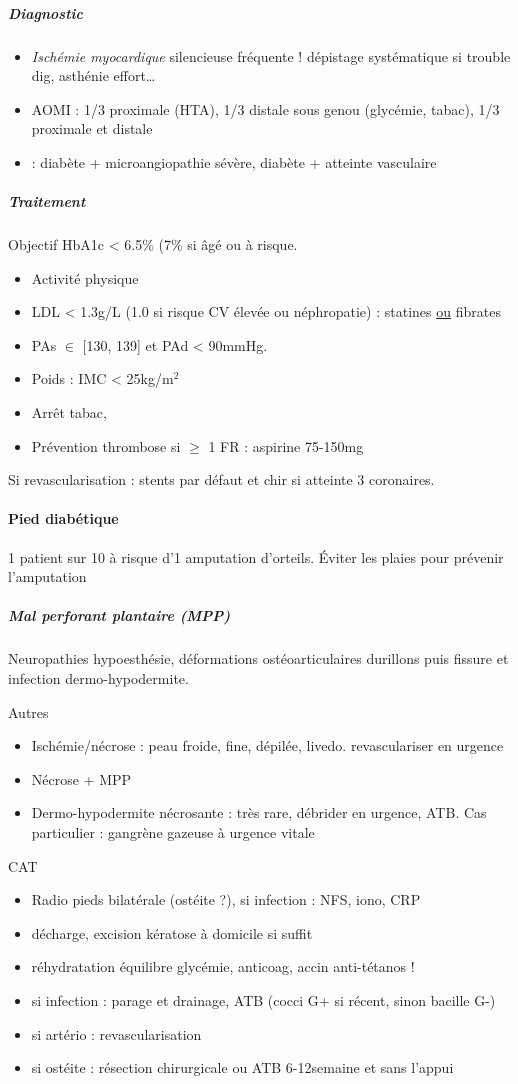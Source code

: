 \documentclass[11pt]{article}
\begin{document}
\subparagraph{Diagnostic}
\label{sec:orgec7b922}
\begin{itemize}
\item \emph{Ischémie myocardique} silencieuse fréquente ! \thus dépistage systématique si
trouble dig, asthénie effort\ldots{}
\item AOMI : 1/3 proximale (HTA), 1/3 distale sous genou (glycémie, tabac), 1/3 proximale et distale
\item \faBomb : diabète + microangiopathie sévère, diabète + atteinte vasculaire
\end{itemize}

\subparagraph{Traitement}
\label{sec:org06f1492}
Objectif HbA1c < 6.5\% (7\% si âgé ou à risque.
\begin{itemize}
\item Activité physique
\item LDL < 1.3g/L (1.0 si risque CV élevée ou néphropatie) : statines \uline{ou} fibrates
\item PAs \(\in\) [130, 139] et PAd < 90mmHg.
\item Poids : IMC < 25kg/m\(^{\text{2}}\)
\item Arrêt tabac,
\item Prévention thrombose si \(\ge\) 1 FR : aspirine 75-150mg
\end{itemize}
Si revascularisation : stents par défaut  et chir si atteinte 3 coronaires.

\paragraph{Pied diabétique}
\label{sec:orga4330d5}
1 patient sur 10 à risque d'1 amputation d'orteils. Éviter les plaies pour prévenir l'amputation
\faBomb
\subparagraph{Mal perforant plantaire (MPP)}
\label{sec:org623d7c5}
Neuropathies \thus hypoesthésie, déformations ostéoarticulaires \thus durillons
puis fissure et infection \thus dermo-hypodermite.

Autres
\begin{itemize}
\item Ischémie/nécrose : peau froide, fine, dépilée, livedo. \thus revasculariser en urgence \faBomb
\item Nécrose + MPP
\item Dermo-hypodermite nécrosante : très rare, \thus débrider en urgence, ATB. 
Cas particulier : gangrène gazeuse à  \thus urgence vitale \danger
\end{itemize}

CAT
\begin{itemize}
\item Radio pieds bilatérale (ostéite ?), si infection : NFS, iono, CRP
\item décharge, excision kératose à domicile si suffit
\item réhydratation \textpm{} équilibre glycémie, anticoag, accin anti-tétanos !
\item si infection : parage et drainage, ATB (cocci G+ si récent, sinon bacille G-)
\item si artério : revascularisation
\item si ostéite : résection chirurgicale ou ATB 6-12semaine et sans l'appui
\end{itemize}
\end{document}
